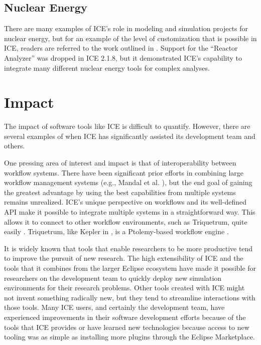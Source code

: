 
\subsection{Nuclear Energy}\label{nuclear-energy}

There are many examples of ICE's role in modeling and simulation
projects for nuclear energy, but for an example of the level of
customization that is possible in ICE, readers are referred to the work outlined in
\cite{billings_domain-specific_2015}. Support for the ``Reactor
Analyzer'' was dropped in ICE 2.1.8, but it demonstrated ICE's capability
to integrate many different nuclear energy tools for complex analyses.

\section{Impact}\label{impact}

The impact of software tools like ICE is difficult to quantify. However,
there are several examples of when ICE has significantly assisted its
development team and others.

One pressing area of interest and impact is that of interoperability
between workflow systems. There have been significant prior efforts in combining
large workflow management systems (e.g., Mandal et al.
\cite{mandal_integrating_2007}), but the end goal of gaining the greatest
advantage by using the best capabilities from multiple systems remains unrealized.
ICE's unique perspective on workflows and its well-defined API make it
possible to integrate multiple systems in a straightforward way. This
allows it to connect to other workflow environments, such as Triquetrum,
quite easily \cite{brooks_introducing_2016}. Triquetrum, like Kepler in
\cite{mandal_integrating_2007}, is a Ptolemy-based workflow engine
\cite{brooks_triquetrum:_2015}.

It is widely known that tools that enable researchers to be more productive tend
to improve the pursuit of new research. The high extensibility of
ICE and the tools that it combines from the larger Eclipse ecosystem
have made it possible for researchers on the development team to quickly
deploy new simulation environments for their research problems. Other tools created
with ICE might not invent something radically new, but they tend to
streamline interactions with those tools. Many ICE users, and certainly
the development team, have experienced improvements in their software
development efforts because of the tools that ICE provides or have learned
new technologies because access to new tooling was as simple as
installing more plugins through the Eclipse Marketplace.


